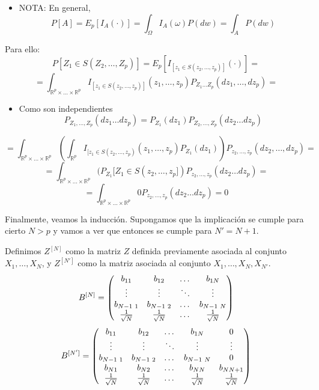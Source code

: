 \documentclass[11pt,a4paper]{article}
\begin{document}
\begin{itemize}
\begin{itemize}
\begin{itemize}
\item NOTA: En general,
$$P[A] = E_{p}[I_{A}(\cdot)] = \int_{\Omega} I_{A}(\omega) P(dw) = \int_{A} P(dw)$$
\end{itemize}

Para ello:
$$P[Z_{1} \in S(Z_{2}, \dots, Z_{p})] = E_{p}[I_{[z_{1} \in S(z_{2}, \dots, z_{p})]}(\cdot)] =$$
$$= \int_{\mathbb{R}^{p} \times \dots \times \mathbb{R}^{p}} I_{[z_{1} \in S(z_{2}, \dots, z_{p})]}(z_{1}, \dots, z_{p}) P_{Z_{1} \dots Z_{p}}(dz_{1}, \dots, dz_{p}) =$$

\begin{itemize}
\item Como son independientes
$$P_{Z_{1}, \dots, Z_{p}} (dz_{1} \dots dz_{p}) = P_{Z_{1}}(dz_{1})P_{Z_{2}, \dots, Z_{p}}(dz_{2} \dots dz_{p})$$
\end{itemize}

$$= \int_{\mathbb{R}^{p} \times \dots \times \mathbb{R}^{p}} (\int_{\mathbb{R}^{p}} I_{[z_{1} \in S(z_{2}, \dots, z_{p})}(z_{1}, \dots, z_{p}) P_{Z_{1}}(dz_{1})) P_{z_{2}, \dots, z_{p}} (dz_{2}, \dots, dz_{p}) =$$
$$= \int_{\mathbb{R}^{p} \times \dots \times \mathbb{R}^{p}} (P_{Z_{1}}[Z_{1} \in S(z_{2}, \dots, z_{p}]) P_{z_{2}, \dots, z_{p}} (dz_{2} \dots dz_{p}) =$$
$$= \int_{\mathbb{R}^{p} \times \dots \times \mathbb{R}^{p}} 0 P_{z_{2}, \dots, z_{p}} (dz_{2} \dots dz_{p}) = 0$$

Finalmente, veamos la inducción. Supongamos que la implicación se cumple para cierto $N > p$ y vamos a ver que entonces se cumple para $N' = N+1$.

Definimos $Z^{[N]}$ como la matriz $Z$ definida previamente asociada al conjunto $X_{1}, \dots, X_{N}$, y $Z^{[N']}$ como la matriz asociada al conjunto $X_{1}, \dots, X_{N}, X_{N'}$.
$$B^{[N]} = \begin{pmatrix}
b_{11} & b_{12} & \dots & b_{1N} \\
\vdots & \vdots & \ddots & \vdots \\
b_{N-1 \hspace{0.1cm} 1} & b_{N-1 \hspace{0.1cm} 2} & \dots & b_{N-1 \hspace{0.1cm} N} \\
\frac{1}{\sqrt{N}} & \frac{1}{\sqrt{N}} & \dots & \frac{1}{\sqrt{N}}
\end{pmatrix}$$
$$B^{[N']} = \begin{pmatrix}
b_{11} & b_{12} & \dots & b_{1N} & 0 \\
\vdots & \vdots & \ddots & \vdots & \vdots \\
b_{N-1 \hspace{0.1cm} 1} & b_{N-1 \hspace{0.1cm} 2} & \dots & b_{N-1 \hspace{0.1cm} N} & 0 \\
b_{N1} & b_{N2} & \dots & b_{NN} & b_{NN+1} \\
\frac{1}{\sqrt{N}} & \frac{1}{\sqrt{N}} & \dots & \frac{1}{\sqrt{N}} & \frac{1}{\sqrt{N}}
\end{pmatrix}$$


\end{itemize}
\end{itemize}
\end{document}
